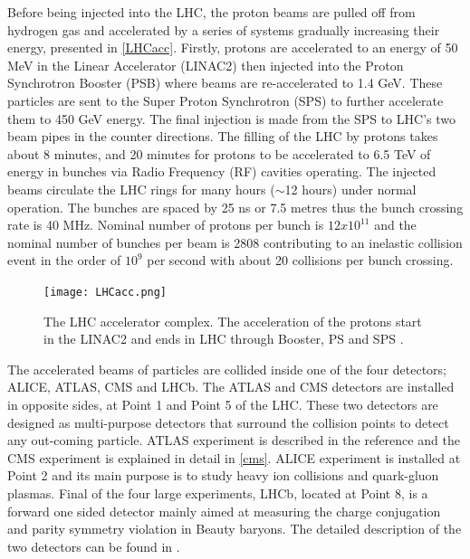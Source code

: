 Before being injected into the LHC, the proton beams are pulled off from hydrogen gas and accelerated by a series of systems gradually increasing their energy, presented in \autoref{LHCacc}. Firstly, protons are accelerated to an energy of 50 MeV in the Linear Accelerator (LINAC2) then injected into the Proton Synchrotron Booster (PSB) where beams are re-accelerated to 1.4 GeV. These particles are sent to the Super Proton Synchrotron (SPS) to further accelerate them to 450 GeV energy. The final injection is made from the SPS to LHC's two beam pipes in the counter directions. The filling of the LHC by protons takes about 8 minutes, and 20 minutes for protons to be accelerated to 6.5 TeV of energy in bunches via Radio Frequency (RF) cavities operating. The injected beams circulate the LHC rings for many hours ($\sim$12 hours) under normal operation. The bunches are spaced by 25 ns or 7.5 metres thus the bunch crossing rate is 40 MHz. Nominal number of protons per bunch is $12x10^{11}$ and the nominal number of bunches per beam is 2808 contributing to an inelastic collision event in the order of $10^9$ per second with about 20 collisions per bunch crossing.

\begin{figure}[ht]
	\centering
	\texttt{[image: LHCacc.png]}
	\vspace{2mm}
	\caption[The LHC accelerator complex. The acceleration of the protons start in the LINAC2 and ends in LHC through Booster, PS and SPS.]
	{The LHC accelerator complex. The acceleration of the protons start in the LINAC2 and ends in LHC through Booster, PS and SPS \cite{Mobs:2197559}.}
	\label{LHCacc}
\end{figure}

The accelerated beams of particles are collided inside one of the four detectors; ALICE, ATLAS, CMS and LHCb. The ATLAS and CMS detectors are installed in opposite sides, at Point 1 and Point 5 of the LHC. These two detectors are designed as multi-purpose detectors that surround the collision points to detect any out-coming particle. ATLAS experiment is described in the reference \cite{ATLAS2008} and the CMS experiment is explained in detail in \autoref{cms}. ALICE experiment is installed at Point 2 and its main purpose is to study heavy ion collisions and quark-gluon plasmas. Final of the four large experiments, LHCb, located at Point 8, is a forward one sided detector mainly aimed at measuring the charge conjugation and parity symmetry violation in Beauty baryons. The detailed description of the two detectors can be found in \cite{ALICE2008, LHCb2008}.

